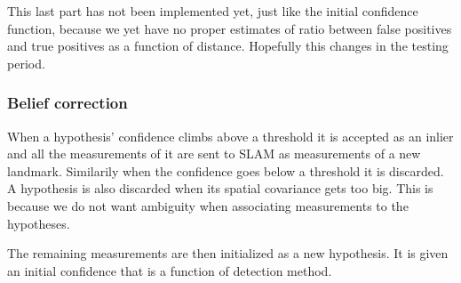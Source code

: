 This last part has not been implemented yet, just like the initial confidence function, because we yet have no proper estimates of ratio between false positives and true positives as a function of distance. Hopefully this changes in the testing period.

\subsubsection{Belief correction}

When a hypothesis' confidence climbs above a threshold it is accepted as an inlier and all the measurements of it are sent to SLAM as measurements of a new landmark. Similarily when the confidence goes below a threshold it is discarded. A hypothesis is also discarded when its spatial covariance gets too big. This is because we do not want ambiguity when associating measurements to the hypotheses. 

The remaining measurements are then initialized as a new hypothesis. It is given an initial confidence that is a function of detection method.

